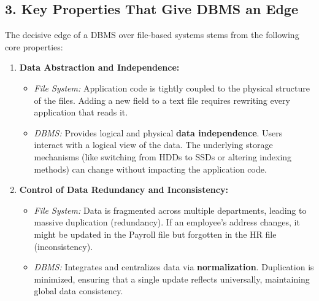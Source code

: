 \documentclass[12pt,a3paper]{article}
\begin{document}
\begin{enumerate}
\begin{tcolorbox}[enhanced,breakable,ansbox,colback=cA!4,colframe=cA,boxrule=0.8pt,arc=5pt,title={\textbf{Answer}},fonttitle=\bfseries\color{white},colbacktitle=cA]
\begin{center}
\end{center}
\vspace{1.5em}

\subsection*{3. Key Properties That Give DBMS an Edge}

The decisive edge of a DBMS over file-based systems stems from the following core properties:

\begin{enumerate}
    \item \textbf{Data Abstraction and Independence:}
    \begin{itemize}
        \item \textit{File System:} Application code is tightly coupled to the physical structure of the files. Adding a new field to a text file requires rewriting every application that reads it.
        \item \textit{DBMS:} Provides logical and physical \textbf{data independence}. Users interact with a logical view of the data. The underlying storage mechanisms (like switching from HDDs to SSDs or altering indexing methods) can change without impacting the application code.
    \end{itemize}
    \vspace{0.5em}

    \item \textbf{Control of Data Redundancy and Inconsistency:}
    \begin{itemize}
        \item \textit{File System:} Data is fragmented across multiple departments, leading to massive duplication (redundancy). If an employee's address changes, it might be updated in the Payroll file but forgotten in the HR file (inconsistency).
        \item \textit{DBMS:} Integrates and centralizes data via \textbf{normalization}. Duplication is minimized, ensuring that a single update reflects universally, maintaining global data consistency.
    \end{itemize}
    \vspace{0.5em}


\end{enumerate}
\end{tcolorbox}
\end{enumerate}
\end{document}
